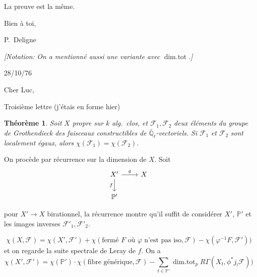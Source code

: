 \documentclass[11pt,a4paper]{article}
\theoremstyle{plain}
\newtheorem{theorem}{Th\'eor\`eme}
\theoremstyle{definition}
\DeclareMathOperator{\dimtot}{dim.tot}
\begin{document}
\medskip

\begin{flushright}
La preuve est la m\^eme.

\medskip

Bien \`a toi,

P.~Deligne
\end{flushright}

\vspace{1cm}

\noindent \textit{[Notation:} \textit{On a mentionn\'e aussi une variante avec} $\dimtot$\textit{.]}


\newpage

\begin{flushright}
28/10/76
\end{flushright}

\noindent Cher Luc,

\begin{flushright}
Troisi\`eme lettre (j'\'etais en forme hier)
\end{flushright}

\begin{theorem}
Soit $X$ propre sur $k$ alg.\ clos, et $\mathcal{F}_1, \mathcal{F}_2$ deux \'el\'ements du groupe de Grothendieck des faisceaux constructibles de $\bar{\mathbb{Q}}_\ell$-vectoriels. Si $\mathcal{F}_1$ et $\mathcal{F}_2$ sont localement \'egaux, alors $\chi(\mathcal{F}_1) = \chi(\mathcal{F}_2)$.
\end{theorem}

On proc\`ede par r\'ecurrence sur la dimension de $X$. Soit
\[
\begin{tikzcd}
X' \arrow[r, "g"] \arrow[d, "f"'] & X \\
\mathbb{P}'
\end{tikzcd}
\]

pour $X' \to X$ birationnel, la r\'ecurrence montre qu'il suffit de consid\'erer $X'$, $\mathbb{P}'$ et les images inverses $\mathcal{F}'_1, \mathcal{F}'_2$.

\[
\chi(X, \mathcal{F}) = \chi(X', \mathcal{F}') + \chi(\text{ferm\'e } F \text{ o\`u } \varphi \text{ n'est pas iso}, \mathcal{F}) - \chi(\varphi^{-1}F, \mathcal{F}'))
\]
et on regarde la suite spectrale de Leray de $f$. On a
\[
\chi(X', \mathcal{F}') = \chi(\mathbb{P}') \cdot \chi(\text{fibre g\'en\'erique}, \mathcal{F}) - \sum_{t \in \mathbb{P}'} \dimtot_p R\Gamma(X_t, \phi^* j_! \mathcal{F}))
\]
\end{document}
